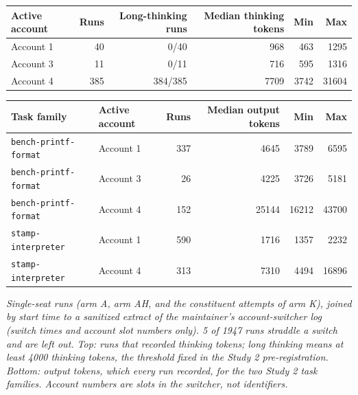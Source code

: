 \begin{tabular}{lrrrrr}
\toprule
Active account & Runs & Long-thinking runs & Median thinking tokens & Min & Max \\
\midrule
Account 1 & 40 & 0/40 & 968 & 463 & 1295 \\
Account 3 & 11 & 0/11 & 716 & 595 & 1316 \\
Account 4 & 385 & 384/385 & 7709 & 3742 & 31604 \\
\bottomrule
\end{tabular}

\medskip

\begin{tabular}{llrrrr}
\toprule
Task family & Active account & Runs & Median output tokens & Min & Max \\
\midrule
\texttt{bench-printf-format} & Account 1 & 337 & 4645 & 3789 & 6595 \\
\texttt{bench-printf-format} & Account 3 & 26 & 4225 & 3726 & 5181 \\
\texttt{bench-printf-format} & Account 4 & 152 & 25144 & 16212 & 43700 \\
\texttt{stamp-interpreter} & Account 1 & 590 & 1716 & 1357 & 2232 \\
\texttt{stamp-interpreter} & Account 4 & 313 & 7310 & 4494 & 16896 \\
\bottomrule
\end{tabular}

\emph{Single-seat runs (arm A, arm AH, and the constituent attempts of arm K), joined by start time to a sanitized extract of the maintainer's account-switcher log (switch times and account slot numbers only). 5 of 1947 runs straddle a switch and are left out. Top: runs that recorded thinking tokens; long thinking means at least 4000 thinking tokens, the threshold fixed in the Study 2 pre-registration. Bottom: output tokens, which every run recorded, for the two Study 2 task families. Account numbers are slots in the switcher, not identifiers.}
